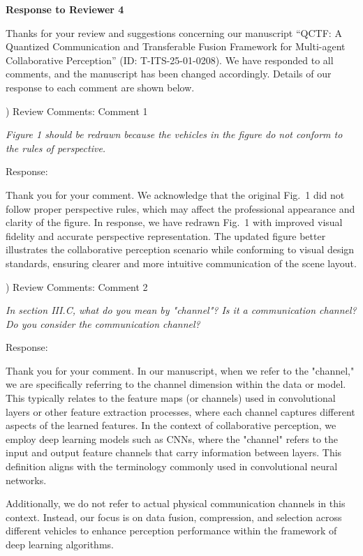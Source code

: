 \documentclass[12pt,a4paper]{article}
\begin{document}
\clearpage
\noindent \textbf{Response to Reviewer 4}

Thanks for your review and suggestions concerning our manuscript ``QCTF: A Quantized Communication and Transferable Fusion Framework for Multi-agent Collaborative Perception'' (ID: T-ITS-25-01-0208). We have responded to all comments, and the manuscript has been changed accordingly. Details of our response to each comment are shown below.

) Review Comments: Comment 1

\textit{Figure 1 should be redrawn because the vehicles in the figure do not conform to the rules of perspective.}

\noindent Response:

Thank you for your comment. We acknowledge that the original Fig.~1 did not follow proper perspective rules, which may affect the professional appearance and clarity of the figure. In response, we have redrawn Fig.~1 with improved visual fidelity and accurate perspective representation. The updated figure better illustrates the collaborative perception scenario while conforming to visual design standards, ensuring clearer and more intuitive communication of the scene layout.


\vspace{4ex}


) Review Comments: Comment 2

\textit{In section III.C, what do you mean by "channel"? Is it a communication channel? Do you consider the communication channel?}

\noindent Response:

Thank you for your comment. In our manuscript, when we refer to the "channel," we are specifically referring to the channel dimension within the data or model. This typically relates to the feature maps (or channels) used in convolutional layers or other feature extraction processes, where each channel captures different aspects of the learned features. In the context of collaborative perception, we employ deep learning models such as CNNs, where the "channel" refers to the input and output feature channels that carry information between layers. This definition aligns with the terminology commonly used in convolutional neural networks.

Additionally, we do not refer to actual physical communication channels in this context. Instead, our focus is on data fusion, compression, and selection across different vehicles to enhance perception performance within the framework of deep learning algorithms.
\end{document}
